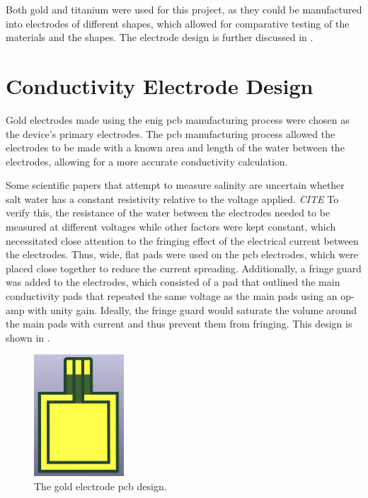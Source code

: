 Both gold and titanium were used for this project, as they could be manufactured into electrodes of different shapes, which allowed for comparative testing of the materials and the shapes.
The electrode design is further discussed in .

\section{Conductivity Electrode Design}\label{sec:conductivity-electrode-design}

Gold electrodes made using the \gls{enig} \gls{pcb} manufacturing process were chosen as the device's primary electrodes.
The \gls{pcb} manufacturing process allowed the electrodes to be made with a known area and length of the water between the electrodes, allowing for a more accurate conductivity calculation.

Some scientific papers that attempt to measure salinity are uncertain whether salt water has a constant resistivity relative to the voltage applied.
\textit{CITE}
To verify this, the resistance of the water between the electrodes needed to be measured at different voltages while other factors were kept constant, which necessitated close attention to the fringing effect of the electrical current between the electrodes.
Thus, wide, flat pads were used on the \gls{pcb} electrodes, which were placed close together to reduce the current spreading.
Additionally, a fringe guard was added to the electrodes, which consisted of a pad that outlined the main conductivity pads that repeated the same voltage as the main pads using an op-amp with unity gain.
Ideally, the fringe guard would saturate the volume around the main pads with current and thus prevent them from fringing.
This design is shown in .

\begin{figure}[ht]
    \centering
    \includegraphics[width=0.3\textwidth]{Figures/GoldElectrode}
    \caption{The gold electrode \gls{pcb} design.}
    \label{fig:gold-electrode} %
\end{figure}

